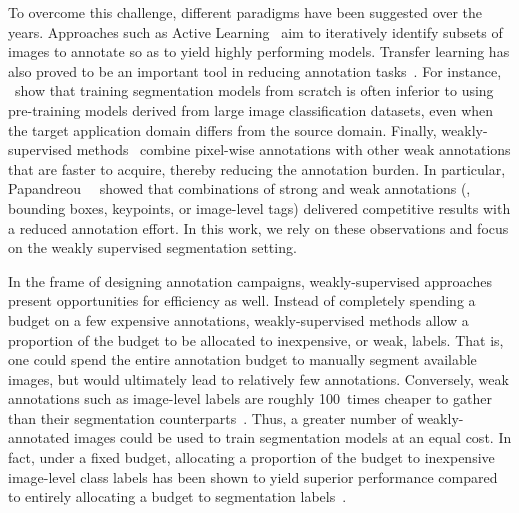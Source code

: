 
To overcome this challenge, different paradigms have been suggested over the years. Approaches such as Active Learning~ aim to iteratively identify subsets of images to annotate so as to yield highly performing models. Transfer learning has also proved to be an important tool in reducing annotation tasks~. For instance, ~show that training segmentation models from scratch is often inferior to using pre-training models derived from large image classification datasets, even when the target application domain differs from the source domain. Finally, weakly-supervised methods~ combine pixel-wise annotations with other weak annotations that are faster to acquire, thereby reducing the annotation burden. In particular, Papandreou~\etal~ showed that combinations of strong and weak annotations (\eg, bounding boxes, keypoints, or image-level tags) delivered competitive results with a reduced annotation effort. In this work, we rely on these observations and focus on the weakly supervised segmentation setting.


In the frame of designing annotation campaigns, weakly-supervised approaches present opportunities for efficiency as well. Instead of completely spending a budget on a few expensive annotations, weakly-supervised methods allow a proportion of the budget to be allocated to inexpensive, or weak, labels. That is, one could spend the entire annotation budget to manually segment available images, but would ultimately lead to relatively few annotations. Conversely, weak annotations such as image-level labels are roughly 100~times cheaper to gather than their segmentation counterparts~. Thus, a greater number of weakly-annotated images could be used to train segmentation models at an equal cost. In fact, under a fixed budget, allocating a proportion of the budget to inexpensive image-level class labels has been shown to yield superior performance compared to entirely allocating a budget to segmentation labels~.

